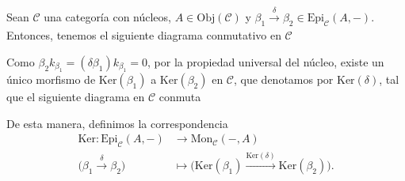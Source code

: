 \documentclass[tesis]{subfiles}
\begin{document}
\begin{Def}\label{Def: Funtor Ker}
    Sean $\mathscr{C}$ una categoría con núcleos, $A\in\text{Obj}(\mathscr{C})$ y $\beta_1\xrightarrow[]{\delta}\beta_2\in\text{Epi}_\mathscr{C}(A,-)$. Entonces, tenemos el siguiente diagrama conmutativo en $\mathscr{C}$
    \begin{center}
    \end{center}
    Como $\beta_2k_{\beta_1} = (\delta\beta_1)k_{\beta_1} = 0$, por la propiedad universal del núcleo, existe un único morfismo de $\text{Ker}(\beta_1)$ a $\text{Ker}(\beta_2)$ en $\mathscr{C}$, que denotamos por $\text{Ker}(\delta)$, tal que el siguiente diagrama en $\mathscr{C}$ conmuta
    \begin{center}
    \end{center}
    De esta manera, definimos la correspondencia
    \begin{align*}
        \text{Ker}:\text{Epi}_\mathscr{C}(A,-) &\to \text{Mon}_\mathscr{C}(-,A) \\
        \big(\beta_1\xrightarrow[]{\delta}\beta_2\big) &\mapsto \big( \text{Ker}(\beta_1)\xrightarrow[]{\text{Ker}(\delta)} \text{Ker}(\beta_2)\big).
    \end{align*}
\end{Def}
\end{document}
